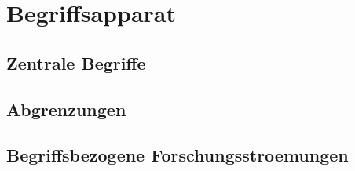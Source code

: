 \chapter{Begriffsapparat}\label{chap:begriffe}

\section{Zentrale Begriffe}\label{sec:zentrale-begriffe}

\section{Abgrenzungen}\label{sec:abgrenzungen}

\section{Begriffsbezogene Forschungsstroemungen}\label{sec:stroemungen}
